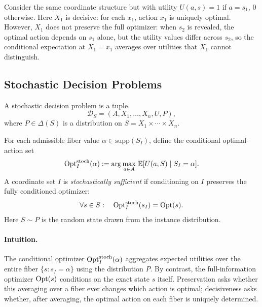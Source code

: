 \begin{example}
Consider the same coordinate structure but with utility $U(a,s)=1$ if $a = s_1$, 0 otherwise. Here $X_1$ is decisive: for each $x_1$, action $x_1$ is uniquely optimal. However, $X_1$ does not preserve the full optimizer: when $s_2$ is revealed, the optimal action depends on $s_1$ alone, but the utility values differ across $s_2$, so the conditional expectation at $X_1=x_1$ averages over utilities that $X_1$ cannot distinguish.
\end{example}

\subsection{Stochastic Decision Problems}

\begin{definition}\label{def:stochastic-decision-problem}
A stochastic decision problem is a tuple
\[
\mathcal{D}_S=(A,X_1,\ldots,X_n,U,P),
\]
where $P\in\Delta(S)$ is a distribution on $S=X_1\times\cdots\times X_n$.
\end{definition}

\begin{definition}\label{def:stochastic-sufficient}
For each admissible fiber value $\alpha \in \mathrm{supp}(S_I)$, define the conditional optimal-action set
\[
\mathrm{Opt}^{\mathrm{stoch}}_I(\alpha)
:=
\arg\max_{a\in A}\,\mathbb{E}[U(a,S)\mid S_I = \alpha].
\]
A coordinate set $I$ is \emph{stochastically sufficient} if conditioning on $I$ preserves the fully conditioned optimizer:
\[
\forall s \in S:\quad \mathrm{Opt}^{\mathrm{stoch}}_I(s_I)=\mathrm{Opt}(s).
\]
Here $S \sim P$ is the random state drawn from the instance distribution.
\end{definition}

\paragraph{Intuition.}
The conditional optimizer $\mathrm{Opt}^{\mathrm{stoch}}_I(\alpha)$ aggregates expected utilities over the entire fiber $\{s : s_I = \alpha\}$ using the distribution $P$. By contrast, the full-information optimizer $\mathrm{Opt}(s)$ conditions on the exact state $s$ itself. Preservation asks whether this averaging over a fiber ever changes which action is optimal; decisiveness asks whether, after averaging, the optimal action on each fiber is uniquely determined.

